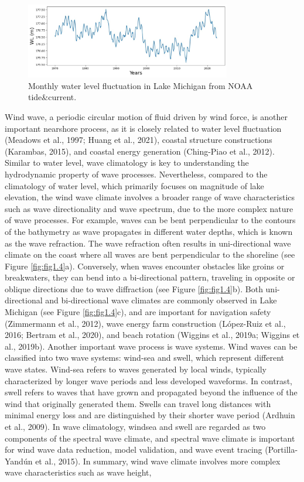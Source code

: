 \begin{figure}[htbp]
  \centering
  \includegraphics[width=0.8\textwidth]{chapter1/resources/figure1-3.jpg}
  \caption{Monthly water level fluctuation in Lake Michigan from NOAA tide\&current.}
  \label{fig:fig1.3}
\end{figure}

Wind wave, a periodic circular motion of fluid driven by wind force, is another important nearshore process, as it is closely related to water level fluctuation (Meadows et al., 1997; Huang et al., 2021), coastal structure constructions (Karambas, 2015), and coastal energy generation (Ching-Piao et al., 2012). Similar to water level, wave climatology is key to understanding the hydrodynamic property of wave processes. Nevertheless, compared to the climatology of water level, which primarily focuses on magnitude of lake elevation, the wind wave climate involves a broader range of wave characteristics such as wave directionality and wave spectrum, due to the more complex nature of wave processes. For example, waves can be bent perpendicular to the contours of the bathymetry as wave propagates in different water depths, which is known as the wave refraction. The wave refraction often results in uni-directional wave climate on the coast where all waves are bent perpendicular to the shoreline (see Figure \ref{fig:fig1.4}a). Conversely, when waves encounter obstacles like groins or breakwaters, they can bend into a bi-directional pattern, traveling in opposite or oblique directions due to wave diffraction (see Figure \ref{fig:fig1.4}b). Both uni-directional and bi-directional wave climates are commonly observed in Lake Michigan (see Figure \ref{fig:fig1.4}c), and are important for navigation safety (Zimmermann et al., 2012), wave energy farm construction (López-Ruiz et al., 2016; Bertram et al., 2020), and beach rotation (Wiggins et al., 2019a; Wiggins et al., 2019b). Another important wave process is wave systems. Wind waves can be classified into two wave systems: wind-sea and swell, which represent different wave states. Wind-sea refers to waves generated by local winds, typically characterized by longer wave periods and less developed waveforms. In contrast, swell refers to waves that have grown and propagated beyond the influence of the wind that originally generated them. Swells can travel long distances with minimal energy loss and are distinguished by their shorter wave period (Ardhuin et al., 2009). In wave climatology, windsea and swell are regarded as two components of the spectral wave climate, and spectral wave climate is important for wind wave data reduction, model validation, and wave event tracing (Portilla-Yandún et al., 2015). In summary, wind wave climate involves more complex wave characteristics such as wave height, 